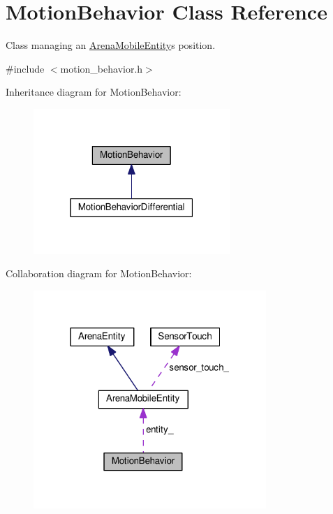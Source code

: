 \hypertarget{classMotionBehavior}{}\section{Motion\+Behavior Class Reference}
\label{classMotionBehavior}


Class managing an \hyperlink{classArenaMobileEntity}{Arena\+Mobile\+Entity}\textquotesingle{}s position.  




{\ttfamily \#include $<$motion\+\_\+behavior.\+h$>$}



Inheritance diagram for Motion\+Behavior\+:\nopagebreak
\begin{figure}[H]
\begin{center}
\leavevmode
\includegraphics[width=211pt]{classMotionBehavior__inherit__graph}
\end{center}
\end{figure}


Collaboration diagram for Motion\+Behavior\+:\nopagebreak
\begin{figure}[H]
\begin{center}
\leavevmode
\includegraphics[width=250pt]{classMotionBehavior__coll__graph}
\end{center}
\end{figure}

